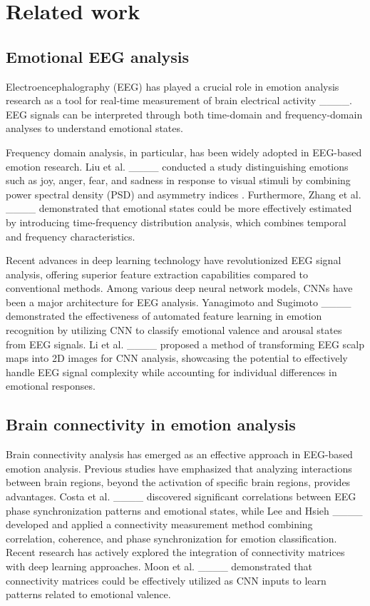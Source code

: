 \section{Related work}
\subsection{Emotional EEG analysis}

Electroencephalography (EEG) has played a crucial role in emotion analysis research as a tool for real-time measurement of brain electrical activity ____. EEG signals can be interpreted through both time-domain and frequency-domain analyses to understand emotional states.

Frequency domain analysis, in particular, has been widely adopted in EEG-based emotion research. Liu et al. ____ conducted a study distinguishing emotions such as joy, anger, fear, and sadness in response to visual stimuli by combining power spectral density (PSD) and asymmetry indices . Furthermore, Zhang et al. ____ demonstrated that emotional states could be more effectively estimated by introducing time-frequency distribution analysis, which combines temporal and frequency characteristics.

Recent advances in deep learning technology have revolutionized EEG signal analysis, offering superior feature extraction capabilities compared to conventional methods. Among various deep neural network models, CNNs have been a major architecture for EEG analysis. Yanagimoto and Sugimoto ____ demonstrated the effectiveness of automated feature learning in emotion recognition by utilizing CNN to classify emotional valence and arousal states from EEG signals. 
Li et al. ____ proposed a method of transforming EEG scalp maps into 2D images for CNN analysis, showcasing the potential to effectively handle EEG signal complexity while accounting for individual differences in emotional responses.


\subsection{Brain connectivity in emotion analysis}
Brain connectivity analysis has emerged as an effective approach in EEG-based emotion analysis. Previous studies have emphasized that analyzing interactions between brain regions, beyond the activation of specific brain regions, provides advantages. Costa et al. ____ discovered significant correlations between EEG phase synchronization patterns and emotional states, while Lee and Hsieh ____ developed and applied a connectivity measurement method combining correlation, coherence, and phase synchronization for emotion classification.
Recent research has actively explored the integration of connectivity matrices with deep learning approaches. Moon et al. ____ demonstrated that connectivity matrices could be effectively utilized as CNN inputs to learn patterns related to emotional valence.

